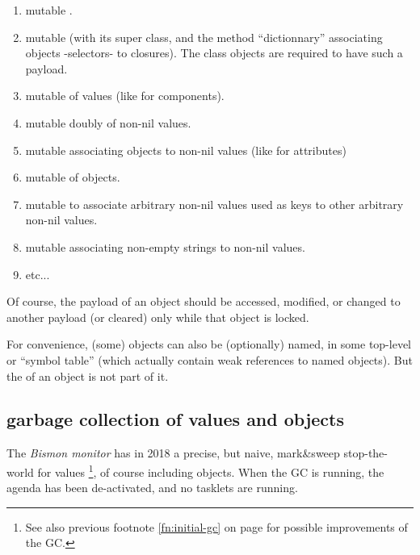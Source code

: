 \begin{itemize}
        \begin{enumerate}
        \item mutable .
          \item mutable  (with its super class, and
            the method ``dictionnary'' associating objects -selectors-
            to closures). The class objects are required to have such
            a payload.
        \item mutable  of values (like
          for components).
        \item mutable  doubly  of non-nil values.
        \item mutable  associating objects to non-nil values (like for
          attributes)
        \item mutable  of objects.
        \item mutable  to associate arbitrary
            non-nil values used as keys to other arbitrary non-nil
            values.
            \item mutable  associating
              non-empty strings to non-nil values.
          \item etc...
        \end{enumerate}

        Of course, the payload of an object should be accessed,
        modified, or changed to another payload (or cleared) only
        while that object is locked.
\end{itemize}

\medskip

For convenience, (some) objects can also be (optionally) named, in
some top-level  or ``symbol
table'' (which actually contain weak references to named objects). But
the  of an object is not part of it.

\bigskip

\subsection{garbage collection of values and objects}

The \emph{Bismon monitor} has in 2018 a precise, but naive,
mark\&sweep stop-the-world  for values \footnote{See also previous footnote
  \ref{fn:initial-gc} on page \pageref{fn:initial-gc} for possible
  improvements of the GC.}, of course including objects. When the GC
is running, the agenda has been de-activated, and no tasklets are
running.

